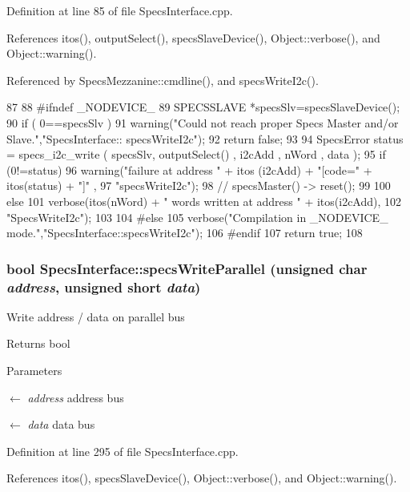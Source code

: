 Definition at line 85 of file SpecsInterface.cpp.

References itos(), outputSelect(), specsSlaveDevice(), Object::verbose(), and Object::warning().

Referenced by SpecsMezzanine::cmdline(), and specsWriteI2c().


\begin{DoxyCode}
87                                           {
88 #ifndef _NODEVICE_
89   SPECSSLAVE *specsSlv=specsSlaveDevice();
90   if ( 0==specsSlv ){
91     warning("Could not reach proper Specs Master and/or Slave.","SpecsInterface::
      specsWriteI2c");
92     return false;
93   }
94   SpecsError status = specs_i2c_write ( specsSlv, outputSelect() , i2cAdd , nWord
       , data );
95   if (0!=status){
96     warning("failure at address " + itos (i2cAdd) + "[code=" + itos(status) + "]"
       ,
97             "specsWriteI2c");
98     //    specsMaster() -> reset();
99   }
100   else {
101     verbose(itos(nWord) + " words written at address " + itos(i2cAdd),
102             "SpecsWriteI2c");
103   }
104 #else
105   verbose("Compilation in _NODEVICE_ mode.","SpecsInterface::specsWriteI2c");
106 #endif
107   return true;
108 }
\end{DoxyCode}
\hypertarget{classSpecsInterface_a232c39e46091c493ad9d061428dd2a8b}{
\subsubsection[{specsWriteParallel}]{\setlength{\rightskip}{0pt plus 5cm}bool SpecsInterface::specsWriteParallel (unsigned char {\em address}, \/  unsigned short {\em data})}}
\label{classSpecsInterface_a232c39e46091c493ad9d061428dd2a8b}
Write address / data on parallel bus

\begin{DoxyReturn}{Returns}
bool 
\end{DoxyReturn}

\begin{DoxyParams}{Parameters}
\item[\mbox{$\leftarrow$} {\em address}]address bus \item[\mbox{$\leftarrow$} {\em data}]data bus \end{DoxyParams}


Definition at line 295 of file SpecsInterface.cpp.

References itos(), specsSlaveDevice(), Object::verbose(), and Object::warning().


